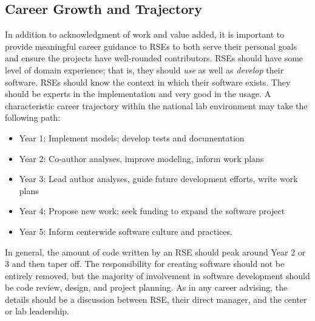 \documentclass[]{nrel}
\begin{document}
\begin{appendices}
\section{Career Growth and Trajectory}
In addition to acknowledgment of work and value added, it is important to provide meaningful
career guidance to RSEs to both serve their personal goals and ensure the projects have well-rounded contributors. RSEs should have some level of domain
experience; that is, they should \textit{use} as well as \textit{develop} their software.
RSEs should know the context in which their software exists.
They should be experts in the implementation and very good in the usage.
A characteristic career trajectory within the national lab environment may take the following path:

\begin{itemize}
\item Year 1: Implement models; develop tests and documentation
\item Year 2: Co-author analyses, improve modeling, inform work plans
\item Year 3: Lead author analyses, guide future development efforts, write work plans
\item Year 4: Propose new work; seek funding to expand the software project
\item Year 5: Inform centerwide software culture and practices.
\end{itemize}

In general, the amount of code written by an RSE should peak around Year 2 or 3 and
then taper off. The responsibility for creating software should not be entirely removed, but
the majority of involvement in software development should be code review, design, and
project planning. As in any career advising, the details should be a discussion between RSE, their
direct manager, and the center or lab leadership.


\end{appendices}
\end{document}
